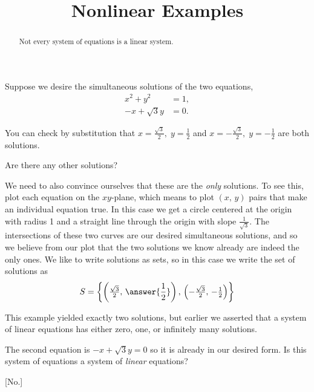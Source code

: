 \documentclass{ximera}
\title{Nonlinear Examples}
\begin{document}
\begin{abstract}
  Not every system of equations is a linear system.
\end{abstract}
\maketitle

\begin{example}
  Suppose we desire the simultaneous solutions of the two equations,
  \begin{align*}
    x^2+y^2&=1,\\
    -x+\sqrt{3}y&=0.
  \end{align*}
  
  You can check by substitution that $x=\tfrac{\sqrt{3}}{2},\;y=\tfrac{1}{2}$ and $x=-\tfrac{\sqrt{3}}{2},\;y=-\tfrac{1}{2}$ are both solutions.

  \begin{question}
    Are there any other solutions?
    \begin{multipleChoice}
    \end{multipleChoice}
    
    \begin{question}
      We need to also convince ourselves that these are the
      \textit{only} solutions.  To see this, plot each equation on the
      $xy$-plane, which means to plot $(x,\,y)$ pairs that make an
      individual equation true.  In this case we get a circle centered
      at the origin with radius 1 and a straight line through the origin
      with slope $\tfrac{1}{\sqrt{3}}$.  The intersections of these two
      curves are our desired simultaneous solutions, and so we believe
      from our plot that the two solutions we know already are indeed
      the only ones.  We like to write solutions as sets, so in this
      case we write the set of solutions as
      \[
        S=\set{\left(\tfrac{\sqrt{3}}{2},\,\answer{\frac{1}{2}}\right),\,\left(-\tfrac{\sqrt{3}}{2},\,-\tfrac{1}{2}\right)}
      \]
      
      \begin{question}
        This example yielded exactly two solutions, but earlier we asserted that a system of linear equations has either zero, one, or infinitely many solutions.
        
        The second equation is $-x+\sqrt{3}y=0$ so it is already in our desired form.  Is this system of equations a system of \textit{linear} equations?
        \begin{multipleChoice}
          [No.]
        \end{multipleChoice}
        

\end{question}
\end{question}
\end{question}
\end{example}
\end{document}
